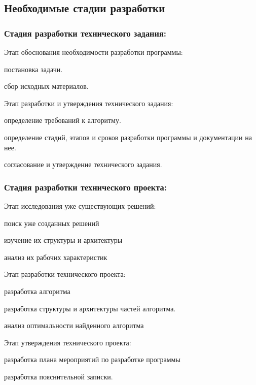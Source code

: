
\subsection{Необходимые стадии разработки}

\subsubsection{Стадия разработки технического задания:}
\begin{my_enumerate}
\item Этап обоснования необходимости разработки программы:
    \begin{my_enumerate}
    \item постановка задачи.
    \item сбор исходных материалов.
    \end{my_enumerate}
\item Этап разработки и утверждения технического задания:
    \begin{my_enumerate}
    \item определение требований к алгоритму.
    \item определение стадий, этапов и сроков разработки программы и документации на нее.
    \item согласование и утверждение технического задания.
    \end{my_enumerate}
\end{my_enumerate}

\subsubsection{Стадия разработки технического проекта:}
\begin{my_enumerate}
\item Этап исследования уже существующих решений:
    \begin{my_enumerate}
    \item поиск уже созданных решений
    \item изучение их структуры и архитектуры
    \item анализ их рабочих характеристик
    \end{my_enumerate}
\item Этап разработки технического проекта:
    \begin{my_enumerate}
    \item разработка алгоритма
    \item разработка структуры и архитектуры частей алгоритма.
    \item анализ оптимальности найденного алгоритма
    \end{my_enumerate}
\item Этап утверждения технического проекта:
    \begin{my_enumerate}
    \item разработка плана мероприятий по разработке программы
    \item разработка пояснительной записки.
    \end{my_enumerate}
\end{my_enumerate}


